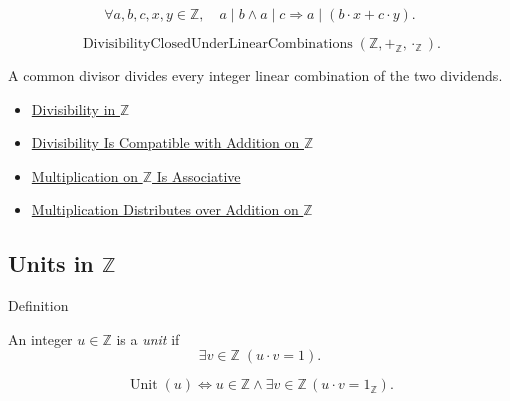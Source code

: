 \begin{remark*}
\[
\forall a,b,c,x,y\in\mathbb{Z},\quad
a\mid b\land a\mid c \Longrightarrow a\mid(b\cdot x+c\cdot y).
\]
\end{remark*}

\begin{remark*}
\[
\operatorname{DivisibilityClosedUnderLinearCombinations}(\mathbb{Z},+_{\mathbb{Z}},\cdot_{\mathbb{Z}}).
\]
\end{remark*}

\begin{remark*}[Interpretation]
A common divisor divides every integer linear combination of the two dividends.
\end{remark*}

\begin{dependencies}
\begin{itemize}
  \item \hyperref[def:divisibility-in-z]{Divisibility in $\mathbb{Z}$}
  \item \hyperref[prop:divisibility-compatible-with-addition-on-z]{Divisibility Is Compatible with Addition on $\mathbb{Z}$}
  \item \hyperref[thm:multiplication-on-z-associative]{Multiplication on $\mathbb{Z}$ Is Associative}
  \item \hyperref[thm:multiplication-distributes-over-addition-on-z]{Multiplication Distributes over Addition on $\mathbb{Z}$}
\end{itemize}
\end{dependencies}

\subsection*{\texorpdfstring{Units in $\mathbb{Z}$}{Units in Z}}

\begin{definitionbox}{Definition}
\begin{definition}
\label{def:unit-in-z}
An integer $u\in\mathbb{Z}$ is a \emph{unit} if
\[
\exists v\in\mathbb{Z}\;(u\cdot v=1).
\]
\end{definition}
\end{definitionbox}

\begin{remark*}
\[
\operatorname{Unit}(u)
\Longleftrightarrow
u\in\mathbb{Z}\land\exists v\in\mathbb{Z}\,(u\cdot v=1_{\mathbb{Z}}).
\]
\end{remark*}

